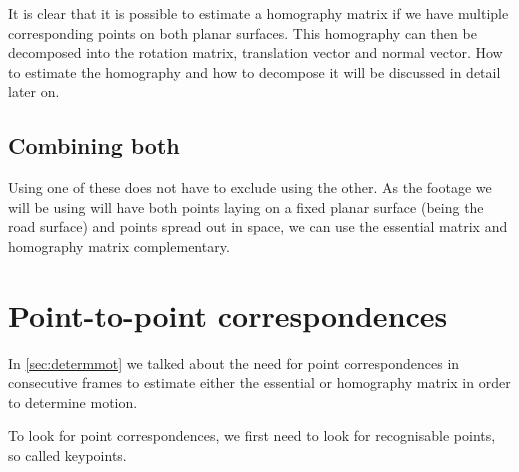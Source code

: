 It is clear that it is possible to estimate a homography matrix if we have multiple corresponding points on both planar surfaces. This homography can then be decomposed into the rotation matrix, translation vector and normal vector. How to estimate the homography and how to decompose it will be discussed in detail later on.

\subsection{Combining both}
Using one of these does not have to exclude using the other. As the footage we will be using will have both points laying on a fixed planar surface (being the road surface) and points spread out in space, we can use the essential matrix and homography matrix complementary.

\section{Point-to-point correspondences}
In \autoref{sec:determmot} we talked about the need for point correspondences in consecutive frames to estimate either the essential or homography matrix in order to determine motion.\bigskip

To look for point correspondences, we first need to look for recognisable points, so called keypoints.


